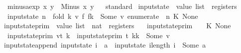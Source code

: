 \begin{isabellebody}
\ \ {\isachardoublequoteopen}minus{\isacharunderscore}aexp\ x\ y\ {\isacharequal}\ Minus\ x\ y{\isachardoublequoteclose}\isanewline
\isanewline
{}\isamarkupfalse%
%
\isadelimproof
\ %
\endisadelimproof
%
\isatagproof
{}\isamarkupfalse%
\ standard%
\endisatagproof
{\isafoldproof}%
%
\isadelimproof
%
\endisadelimproof
\isanewline
{}\isamarkupfalse%
\isanewline
\isanewline
{}\isamarkupfalse%
\ input{}state\ {\isacharcolon}{\isacharcolon}\ {\isachardoublequoteopen}value\ list\ {\isasymRightarrow}\ registers{\isachardoublequoteclose}\ \isanewline
\ \ {\isachardoublequoteopen}input{}state\ n\ {\isacharequal}\ fold\ {\isacharparenleft}{\isasymlambda}{\isacharparenleft}k{\isacharcomma}\ v{\isacharparenright}\ f{\isachardot}\ f{\isacharparenleft}k\ {\isachardollar}{\isacharcolon}{\isacharequal}\ Some\ v{\isacharparenright}{\isacharparenright}\ {\isacharparenleft}enumerate\ {}\ n{\isacharparenright}\ {\isacharparenleft}K{\isachardollar}\ None{\isacharparenright}{\isachardoublequoteclose}\isanewline
\isanewline
{}\isamarkupfalse%
\ input{}state{\isacharunderscore}prim\ {\isacharcolon}{\isacharcolon}\ {\isachardoublequoteopen}value\ list\ {\isasymRightarrow}\ nat\ {\isasymRightarrow}\ registers{\isachardoublequoteclose}\ \isanewline
\ \ {\isachardoublequoteopen}input{}state{\isacharunderscore}prim\ {\isacharbrackleft}{\isacharbrackright}\ {\isacharunderscore}\ {\isacharequal}\ {\isacharparenleft}K{\isachardollar}\ None{\isacharparenright}{\isachardoublequoteclose}\ {\isacharbar}\isanewline
\ \ {\isachardoublequoteopen}input{}state{\isacharunderscore}prim\ {\isacharparenleft}v{\isacharhash}t{\isacharparenright}\ k\ {\isacharequal}\ {\isacharparenleft}input{}state{\isacharunderscore}prim\ t\ {\isacharparenleft}k{\isacharplus}{}{\isacharparenright}{\isacharparenright}{\isacharparenleft}k\ {\isachardollar}{\isacharcolon}{\isacharequal}\ Some\ v{\isacharparenright}{\isachardoublequoteclose}\isanewline
\isanewline
{}\isamarkupfalse%
\ input{}state{\isacharunderscore}append{\isacharcolon}\ {\isachardoublequoteopen}input{}state\ {\isacharparenleft}i\ {\isacharat}\ {\isacharbrackleft}a{\isacharbrackright}{\isacharparenright}\ {\isacharequal}\ {\isacharparenleft}input{}state\ i{\isacharparenright}{\isacharparenleft}length\ i\ {\isachardollar}{\isacharcolon}{\isacharequal}\ Some\ a{\isacharparenright}{\isachardoublequoteclose}\isanewline

\end{isabellebody}
